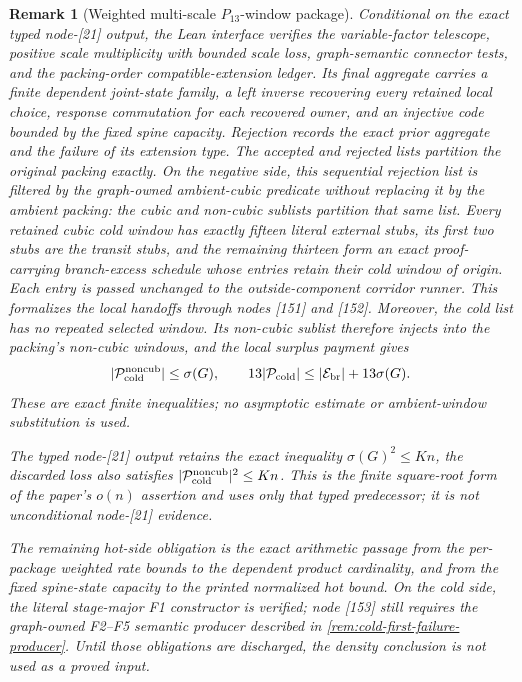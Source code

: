 \documentclass[11pt]{article}
\newtheorem{remark}[theorem]{Remark}
\begin{document}
\begin{remark}[Weighted multi-scale \(P_{13}\)-window package]
Conditional on the exact typed node-[21] output, the Lean interface verifies
the variable-factor telescope, positive scale
multiplicity with bounded scale loss, graph-semantic connector tests, and the
packing-order compatible-extension ledger.  Its final aggregate carries a
finite dependent joint-state family, a left inverse recovering every retained
local choice, response commutation for each recovered owner, and an injective
code bounded by the fixed spine capacity.  Rejection records the exact prior
aggregate and the failure of its extension type.  The accepted and rejected
lists partition the original packing exactly.  On the negative side, this
sequential rejection list is filtered by
the graph-owned ambient-cubic predicate without replacing it by the ambient
packing: the cubic and non-cubic sublists partition that same list.  Every
retained cubic cold window has exactly fifteen literal external stubs, its
first two stubs are the transit stubs, and the remaining thirteen form an
exact proof-carrying branch-excess schedule whose entries retain their cold
window of origin.  Each entry is passed unchanged to the outside-component
corridor runner.  This formalizes the local handoffs through nodes [151] and
[152].  Moreover, the cold list has no repeated selected window.  Its
non-cubic sublist therefore injects into the packing's non-cubic windows, and
the local surplus payment gives
\[
 |\mathcal P_{\rm cold}^{\rm noncub}|\le \sigma(G),
 \qquad
 13|\mathcal P_{\rm cold}|
 \le |\mathcal E_{\rm br}|+13\sigma(G).
\]
These are exact finite inequalities; no asymptotic estimate or ambient-window
substitution is used.

The typed node-[21] output retains the exact inequality
\(\sigma(G)^2\le K n\), the discarded loss also satisfies
\(|\mathcal P_{\rm cold}^{\rm noncub}|^2\le K n\).  This is the finite
square-root form of the paper's \(o(n)\) assertion and uses only that typed
predecessor; it is not unconditional node-[21] evidence.

The remaining hot-side obligation is the exact arithmetic passage from the
per-package weighted rate bounds to the dependent product cardinality, and
from the fixed spine-state capacity to the printed normalized hot bound.  On
the cold side, the literal stage-major F1 constructor is verified; node [153]
still requires the graph-owned F2--F5 semantic producer described in
\cref{rem:cold-first-failure-producer}.  Until those obligations are
discharged, the density conclusion is not used as a proved input.
\end{remark}
\end{document}
